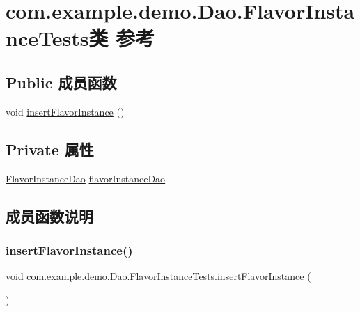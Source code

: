 \hypertarget{classcom_1_1example_1_1demo_1_1_dao_1_1_flavor_instance_tests}{}\section{com.\+example.\+demo.\+Dao.\+Flavor\+Instance\+Tests类 参考}
\label{classcom_1_1example_1_1demo_1_1_dao_1_1_flavor_instance_tests}
\subsection*{Public 成员函数}
\begin{DoxyCompactItemize}
\item 
void \mbox{\hyperlink{classcom_1_1example_1_1demo_1_1_dao_1_1_flavor_instance_tests_ae5381971cce5c91ec80ccafdc5487af8}{insert\+Flavor\+Instance}} ()
\end{DoxyCompactItemize}
\subsection*{Private 属性}
\begin{DoxyCompactItemize}
\item 
\mbox{\hyperlink{interfacecom_1_1example_1_1demo_1_1dao_1_1_flavor_instance_dao}{Flavor\+Instance\+Dao}} \mbox{\hyperlink{classcom_1_1example_1_1demo_1_1_dao_1_1_flavor_instance_tests_a4a00bbbb08fd5e2de00e55fc961f330f}{flavor\+Instance\+Dao}}
\end{DoxyCompactItemize}


\subsection{成员函数说明}
\mbox{\label{classcom_1_1example_1_1demo_1_1_dao_1_1_flavor_instance_tests_ae5381971cce5c91ec80ccafdc5487af8}} 
\subsubsection{\texorpdfstring{insert\+Flavor\+Instance()}{insertFlavorInstance()}}
{\footnotesize\ttfamily void com.\+example.\+demo.\+Dao.\+Flavor\+Instance\+Tests.\+insert\+Flavor\+Instance (\begin{DoxyParamCaption}{ }\end{DoxyParamCaption})}



